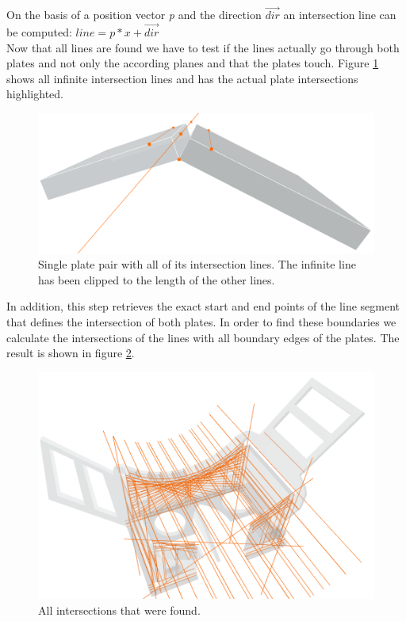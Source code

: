 \documentclass[../ClassicThesis.tex]{subfiles}
\begin{document}
On the basis of a position vector \emph{p} and the direction $\vec{dir}$ an intersection line can be computed: $ line = p*x + \vec{dir}$
\\
Now that all lines are found we have to test if the lines actually go through both plates and not only the according planes and that the plates touch. Figure \ref{fig:infiniteIntersections} shows all infinite intersection lines and has the actual plate intersections highlighted.
\begin{figure}[!ht]
\centering
\includegraphics[width=1\columnwidth]{Images/06-1-graph-fourIntersectionLines.png}
\caption{Single plate pair with all of its intersection lines. The infinite line has been clipped to the length of the other lines.}
\label{fig:infiniteIntersections}
\end{figure}
In addition, this step retrieves the exact start and end points of the line segment that defines the intersection of both plates. In order to find these boundaries we calculate the intersections of the lines with all boundary edges of the plates. The result is shown in figure \ref{fig:allBoundaries}.\\
\begin{figure}[!ht]
\centering
\includegraphics[width=\columnwidth]{Images/AllIntersectionsHMD.png}
\caption{All intersections that were found. }
\label{fig:allBoundaries}
\end{figure}
\end{document}
